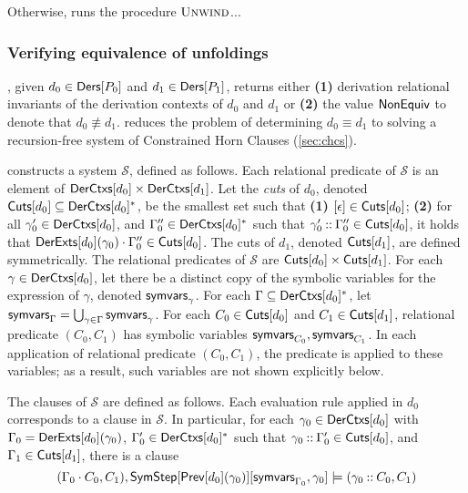 Otherwise, \chkindaux runs the procedure $\textsc{Unwind}$...

\subsubsection{Verifying equivalence of unfoldings}
\label{sec:verify-ders}
%
\verifyunfoldings, given $d_0 \in \mathsf{Ders}[  P_0  ]$ and %
$d_1 \in \mathsf{Ders}[  P_1  ]$, returns either \textbf{(1)} derivation
relational invariants of the derivation contexts of $d_0$ and $d_1$
or %
\textbf{(2)} the value $\mathsf{NonEquiv}$ to denote that $d_0 \not\equiv
d_1$.
%
\verifyunfoldings reduces the problem of determining $d_0 \equiv d_1$ to
solving a recursion-free system of Constrained Horn Clauses
(\autoref{sec:chcs}).

\verifyunfoldings constructs a system $\mathcal{S}$, defined as follows.
Each relational predicate of $\mathcal{S}$ is an element of $\mathsf{DerCtxs}[ 
d_0  ] \times \mathsf{DerCtxs}[ d_1 ]$.
%
Let the \emph{cuts} of $d_0$, denoted $\mathsf{Cuts}[ d_0 ] \subseteq \mathsf{DerCtxs}[ 
  d_0  ]^{*}$, be the smallest set such that %
\textbf{(1)} $[ \epsilon ] \in \mathsf{Cuts}[  d_0  ]$; %
\textbf{(2)} for all $\gamma_0' \in \mathsf{DerCtxs}[  d_0  ]$, and %
$\Gamma_0'' \in \mathsf{DerCtxs}[  d_0  ]^{*}$ such that $\gamma_0' \mathbin{::}
\Gamma_0'' \in \mathsf{Cuts}[  d_0  ]$, %
it holds that $\mathsf{DerExts}[  d_0  ](\gamma_0) \cdot \Gamma_0'' \in
\mathsf{Cuts}[ d_0 ]$.
%
The cuts of $d_1$, denoted $\mathsf{Cuts}[ d_1 ]$, are defined symmetrically.
The relational predicates of $\mathcal{S}$ are $\mathsf{Cuts}[ d_0 ] \times
\mathsf{Cuts}[ d_1 ]$.
%
For each $\gamma \in \mathsf{DerCtxs}[ d_0 ]$, let there be a distinct copy of
the symbolic variables for the expression of $\gamma$, denoted
$\mathsf{symvars}_{ \gamma }$.
%
For each $\Gamma \subseteq \mathsf{DerCtxs}[ d_0 ]^{*}$, let 
$\mathsf{symvars}_{ \Gamma } = \bigcup_{ \gamma \in \Gamma} \mathsf{symvars}_{\gamma}$.
%
For each $C_0 \in \mathsf{Cuts}[  d_0  ]$ and $C_1 \in \mathsf{Cuts}[  d_1  ]$, relational
predicate $(C_0, C_1)$ has symbolic variables $\mathsf{symvars}_{C_0},
\mathsf{symvars}_{C_1}$.
%
In each application of relational predicate $(C_0, C_1)$, the
predicate is applied to these variables;
%
as a result, such variables are not shown explicitly below.

The clauses of $\mathcal{S}$ are defined as follows.
%
Each evaluation rule applied in $d_0$ corresponds to a clause in
$\mathcal{S}$.
% 
In particular, for each $\gamma_0 \in \mathsf{DerCtxs}[  d_0  ]$ with $\Gamma_0
= \mathsf{DerExts}[  d_0  ]( \gamma_0 )$, %
$\Gamma_0' \in \mathsf{DerCtxs}[  d_0  ]^{*}$ such that $\gamma_0 \mathbin{::}
\Gamma_0' \in \mathsf{Cuts}[  d_0  ]$, and %
$\Gamma_1 \in \mathsf{Cuts}[  d_1  ]$, there is a clause %
\[ (\Gamma_0 \concat C_0, C_1), %
\symstep{ \prevrule{ d_0 }( \gamma_0 ) }[ %
\symvars{ \Gamma_0 }, \gamma_0 ] \entails %
(\gamma_0 \cons C_0, C_1) \]

